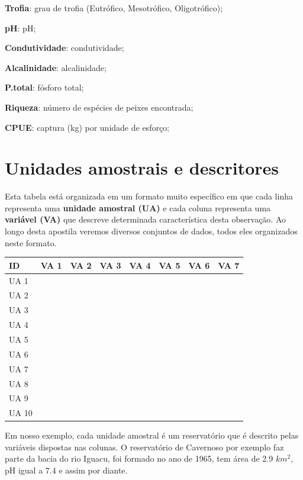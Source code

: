 \documentclass[
]{book}
\begin{document}
\textbf{Trofia}: grau de trofia (Eutrófico, Mesotrófico, Oligotrófico);

\textbf{pH}: pH;

\textbf{Condutividade}: condutividade;

\textbf{Alcalinidade}: alcalinidade;

\textbf{P.total}: fósforo total;

\textbf{Riqueza}: número de espécies de peixes encontrada;

\textbf{CPUE}: captura (kg) por unidade de esforço;

\hypertarget{unidades-amostrais-e-descritores}{%
\section{Unidades amostrais e descritores}\label{unidades-amostrais-e-descritores}}

Esta tabela está organizada em um formato muito específico em que cada linha representa uma \textbf{unidade amostral (UA)} e cada coluna representa uma \textbf{variável (VA)} que descreve determinada característica desta observação. Ao longo desta apostila veremos diversos conjuntos de dados, todos eles organizados neste formato.

\begin{table}
\centering\begingroup\fontsize{11}{13}\selectfont

\begin{tabular}{llllllll}
\toprule
ID & VA 1 & VA 2 & VA 3 & VA 4 & VA 5 & VA 6 & VA 7\\
\midrule
UA 1 &  &  &  &  &  &  & \\
UA 2 &  &  &  &  &  &  & \\
UA 3 &  &  &  &  &  &  & \\
UA 4 &  &  &  &  &  &  & \\
UA 5 &  &  &  &  &  &  & \\
\addlinespace
UA 6 &  &  &  &  &  &  & \\
UA 7 &  &  &  &  &  &  & \\
UA 8 &  &  &  &  &  &  & \\
UA 9 &  &  &  &  &  &  & \\
UA 10 &  &  &  &  &  &  & \\
\bottomrule
\end{tabular}
\endgroup{}
\end{table}

Em nosso exemplo, cada unidade amostral é um reservatório que é descrito pelas variáveis dispostas nas colunas. O reservatório de Cavernoso por exemplo faz parte da bacia do rio Iguacu, foi formado no ano de 1965, tem área de 2.9 \(km^2\), pH igual a 7.4 e assim por diante.
\end{document}

